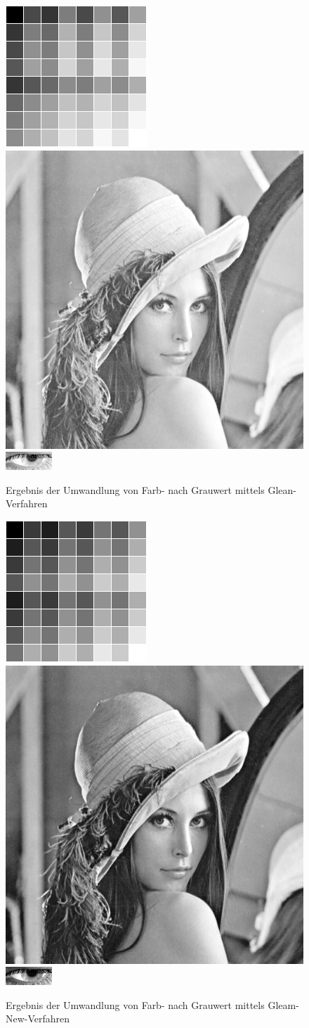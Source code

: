 \begin{figure}
	\centering
	\includegraphics[width=0.2\linewidth]{img/Farbkarte_22}
	\includegraphics[width=0.2\linewidth]{img/Lena_22}
	\includegraphics[width=0.2\linewidth]{img/Auge_22Gray}
	\caption{Ergebnis der Umwandlung von Farb- nach Grauwert mittels Glean-Verfahren}
	\label{img_Gleam}
\end{figure}
\begin{figure}
	\centering
	\includegraphics[width=0.2\linewidth]{img/Farbkarte_New}
	\includegraphics[width=0.2\linewidth]{img/Lena_New}
	\includegraphics[width=0.2\linewidth]{img/Auge_NewGray}
	\caption{Ergebnis der Umwandlung von Farb- nach Grauwert mittels Gleam-New-Verfahren}
	\label{img_NewGeam}
\end{figure}
